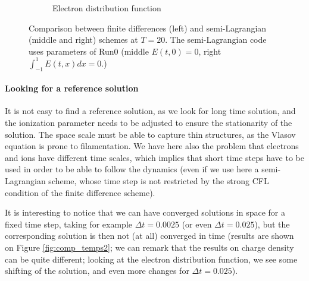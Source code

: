 \documentclass{article}
\numberwithin{equation}{section}
\begin{document}
\begin{figure}
\begin{subfigure}{\textwidth}
		\caption{Electron distribution function}
		\label{subfig:compT02_electron}
	\end{subfigure}
	\caption{Comparison between finite differences (left) and semi-Lagrangian (middle and right) schemes at $T=20$. The semi-Lagrangian code uses parameters of Run0 (middle $E(t,0)=0$, right $\int_{-1}^1E(t,x)dx=0$.)
	}
	\label{fig:compT20}
\end{figure}  


\paragraph{Looking for a reference solution} %

It is not easy to find a reference solution, as we look for long time solution, and the ionization parameter needs to be adjusted to ensure the stationarity of the solution. The space scale must be able to capture thin structures, as the Vlasov equation is prone to filamentation. We have here also the problem that electrons and ions have different time scales, which implies that short time steps have to be used in order to be able to follow the dynamics (even if we use here a semi-Lagrangian scheme, whose time step is not restricted by the strong CFL condition
of the finite difference scheme).

It is interesting to notice that we can have converged solutions in space for a fixed time step, taking for example $\Delta t = 0.0025$ (or even $\Delta t =0.025$), but the corresponding solution is then not (at all) converged in time
(results are shown on Figure \ref{fig:comp_temps2}; we can remark that the results on charge density can be quite different; looking at the electron distribution function, we see some shifting
of the solution, and even more changes for $\Delta t =0.025$). 
\end{document}
